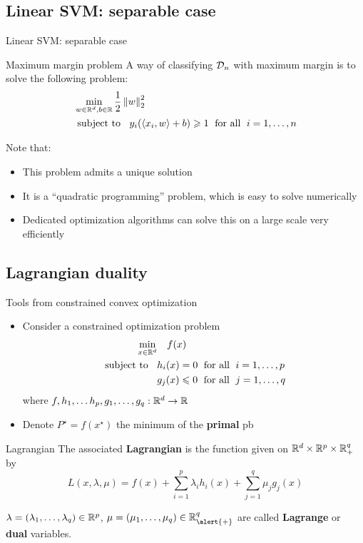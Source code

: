 \documentclass[xcolor={usenames,dvipsnames}]{beamer}
\begin{document}
\subsection{Linear SVM: separable case}
\begin{frame}{Linear SVM: separable case}

\begin{block}{Maximum margin problem}
A way of classifying ${\mathcal{D}}_n$ with maximum margin is to solve the following problem:
\begin{align*}
  &\min_{w \in \mathbb{R}^d, b \in \mathbb{R}} \frac 12 \left\| w \right\|_2^2 \\
  &\text{ subject to } \;\;  y_i (\langle {x_i, w} \rangle  + b) \geqslant 1 \; \text{ for all } 
  \;i=1, \ldots, n
\end{align*}
\end{block}

\medskip

Note that:
\begin{itemize}
  \item This problem admits a \alert{unique} solution
  \item It is a ``quadratic programming'' problem, which is easy to solve numerically
  \item Dedicated optimization algorithms can solve this on a large scale very efficiently
\end{itemize}
\end{frame}


\subsection{Lagrangian duality}
\begin{frame}{Tools from constrained convex optimization}

  \begin{itemize}
    \item Consider a constrained optimization problem
  \begin{align*}
    \min_{x \in \mathbb{R}^d} & \quad f(x) \\
    \text{ subject to } \;\; & h_i(x) = 0 \; \text{ for all } 
    \;i=1, \ldots, p \\
   	 & g_j(x) \leqslant 0 \; \text{ for all } 
    \;j=1, \ldots, q
  \end{align*}
  where $f, h_1, \hdots h_p, g_1, \ldots, g_q : \mathbb{R}^d \rightarrow \mathbb{R}$
  \item Denote $P^\star = f(x^\star)$ the minimum of the \textbf{primal} pb
    \end{itemize}
    
    \begin{block}{Lagrangian}
   The associated \textbf{Lagrangian} is the function given on $\mathbb{R}^d \times \mathbb{R}^p\times \mathbb{R}_+^q$ by
  \begin{equation*}
    L(x, \lambda, \mu) = f(x) + \sum_{i=1}^p \lambda_i h_i(x) + \sum_{j=1}^q \mu_j g_j(x)
  \end{equation*}
  \end{block}
    $\lambda = (\lambda_1, \ldots, \lambda_q) \in \mathbb{R}^p$,   $\mu = (\mu_1, \ldots, \mu_q) \in \R_{\alert{+}}^q$ are called \textbf{Lagrange} or \textbf{dual} variables.

\end{frame}
\end{document}
